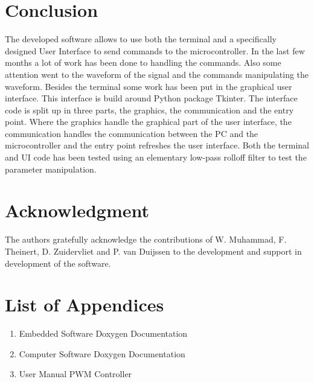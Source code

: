 \documentclass[conference]{IEEEtran}
\begin{document}


\section{Conclusion}
The developed software allows to use both the terminal and a specifically designed User Interface to send commands to the microcontroller. In the last few months a lot of work has been done to handling the commands. Also some attention went to the waveform of the signal and the commands manipulating the waveform. Besides the terminal some work has been put in the graphical user interface. This interface is build around Python package Tkinter. The interface code is split up in three parts, the graphics, the communication and the entry point. Where the graphics handle the graphical part of the user interface, the communication handles the communication between the PC and the microcontroller and the entry point refreshes the user interface. Both the terminal and UI code has been tested using an elementary low-pass rolloff filter to test the parameter manipulation.

\section*{Acknowledgment}
The authors gratefully acknowledge the contributions of W. Muhammad, F. Theinert, D. Zuidervliet and P. van Duijssen to the development and support in development of the software.

\section{List of Appendices}
\begin{enumerate}
\item	Embedded Software Doxygen Documentation
\item	Computer Software Doxygen Documentation
\item	User Manual PWM Controller
\end{enumerate}
\end{document}
